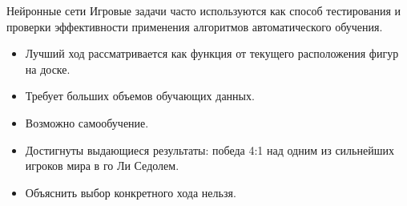 \begin{frame}{Нейронные сети}
Игровые задачи часто используются как способ тестирования и проверки эффективности применения алгоритмов автоматического обучения\footnotemark{}. 
\begin{itemize}
\item Лучший ход рассматривается как функция от текущего расположения фигур на доске.
\item Требует больших объемов обучающих данных.
\item Возможно самообучение.
\item Достигнуты выдающиеся результаты: победа 4:1 над одним из сильнейших игроков мира в го Ли Седолем.
\item Объяснить выбор конкретного хода нельзя.
\end{itemize}
\end{frame}